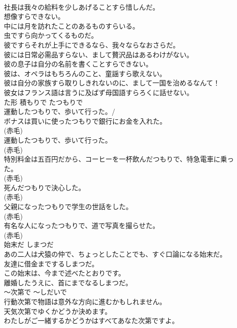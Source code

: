 \documentclass[8pt]{extreport}
\begin{document}
\begin{CJK}{UTF8}{min}
\\	社長は我々の給料を少しあげることすら惜しんだ。   
\\	想像すらできない。   
\\	中には月を訪れたことのあるものすらいる。   
\\	虫ですら向かってくるものだ。   
\\	彼ですらそれが上手にできるなら、我々ならなおさらだ。   
\\	彼には日常必需品すらない、まして贅沢品はあるわけがない。   
\\	彼の息子は自分の名前を書くことすらできない。   
\\	彼は、オペラはもちろんのこと、童謡すら歌えない。   
\\	彼は自分の家族すら取りしきれないのに、まして一国を治めるなんて！   
\\	彼女はフランス語は言うに及ばず母国語すらろくに話せない。   
\\	た形 積もりで	たつもりで	
\\	運動したつもりで、歩いて行った。/ 
\\	ボナスは買いに使ったつもりで銀行にお金を入れた。  
\\	(赤毛)
\\	運動したつもりで、歩いて行った。  
\\	(赤毛)
\\	特別料金は五百円だから、コーヒーを一杯飲んだつもりで、特急電車に乗った。  
\\	(赤毛)
\\	死んだつもりで決心した。  
\\	(赤毛)
\\	父親になったつもりで学生の世話をした。  
\\	(赤毛)
\\	有名な人になったつもりで、道で写真を撮らせた。  
\\	(赤毛)
\\	始末だ	しまつだ	
\\	あの二人は犬猿の仲で、ちょっとしたことでも、すぐ口論になる始末だ。  
\\	友達に借金までするしまつだ。  
\\	この始末は、今まで述べたとおりです。  
\\	離婚したうえに、首にまでなるしまつだ。  
\\	〜次第で	〜しだいで	
\\	行動次第で物語は意外な方向に進むかもしれません。  
\\	天気次第でゆくかどうか決めます。  
\\	わたしがご一緒するかどうかはすべてあなた次第ですよ。  

\end{CJK}
\end{document}
